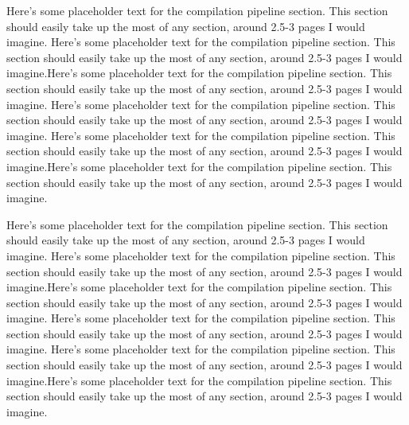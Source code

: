 \documentclass[preprint]{sigplanconf}
\begin{document}
Here's some placeholder text for the compilation pipeline section.  This
section should easily take up the most of any section, around 2.5-3 pages I
would imagine.
Here's some placeholder text for the compilation pipeline section.  This
section should easily take up the most of any section, around 2.5-3 pages I
would imagine.Here's some placeholder text for the compilation pipeline section.
 This
section should easily take up the most of any section, around 2.5-3 pages I
would imagine.
Here's some placeholder text for the compilation pipeline section.  This
section should easily take up the most of any section, around 2.5-3 pages I
would imagine.
Here's some placeholder text for the compilation pipeline section.  This
section should easily take up the most of any section, around 2.5-3 pages I
would imagine.Here's some placeholder text for the compilation pipeline section.
 This
section should easily take up the most of any section, around 2.5-3 pages I
would imagine.

Here's some placeholder text for the compilation pipeline section.  This
section should easily take up the most of any section, around 2.5-3 pages I
would imagine.
Here's some placeholder text for the compilation pipeline section.  This
section should easily take up the most of any section, around 2.5-3 pages I
would imagine.Here's some placeholder text for the compilation pipeline section.
 This
section should easily take up the most of any section, around 2.5-3 pages I
would imagine.
Here's some placeholder text for the compilation pipeline section.  This
section should easily take up the most of any section, around 2.5-3 pages I
would imagine.
Here's some placeholder text for the compilation pipeline section.  This
section should easily take up the most of any section, around 2.5-3 pages I
would imagine.Here's some placeholder text for the compilation pipeline section.
 This
section should easily take up the most of any section, around 2.5-3 pages I
would imagine.
\end{document}
